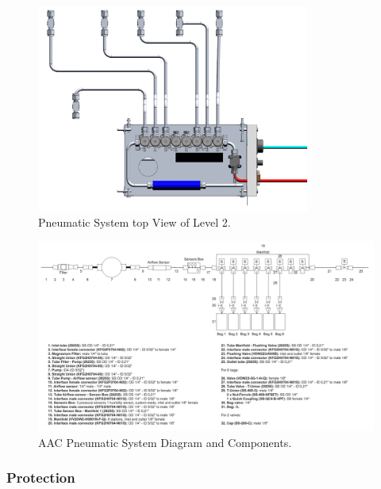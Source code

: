 \begin{figure}[H]
    \centering
    \includegraphics[width=0.8\textwidth]{4-experiment-design/img/Mechanical/Pneumatic_System_Top_View_Level_2.png}
    \caption{Pneumatic System top View of Level 2.}
    \label{level_2_pneumatic_system_top_view}
\end{figure}


\newpage
\begin{landscape}
\begin{figure}[H]
    \centering
    \includegraphics[width=1.5\textwidth]{4-experiment-design/img/Mechanical/AAC_Subsystem.png}
    \caption{AAC Pneumatic System Diagram and Components.}
    \label{pneumatic_system}
\end{figure}
\end{landscape}


\pagebreak
\subsubsection{Protection}


